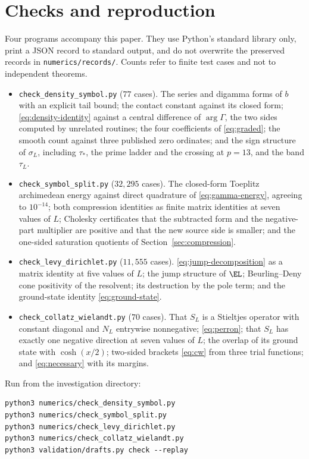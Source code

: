 \section{Checks and reproduction}\label{app:checks}
Four programs accompany this paper. They use Python's standard library only,
print a JSON record to standard output, and do not overwrite the preserved
records in \texttt{numerics/records/}. Counts refer to finite test cases and not
to independent theorems.

\begin{itemize}
\item \texttt{check\_density\_symbol.py} ($77$ cases). The series and digamma
forms of $b$ with an explicit tail bound; the contact constant against its
closed form; \eqref{eq:density-identity} against a central difference of
$\arg\Gamma$, the two sides computed by unrelated routines; the four
coefficients of \eqref{eq:graded}; the smooth count against three published zero
ordinates; and the sign structure of $\sigma_L$, including $\tau_*$, the prime
ladder and the crossing at $p=13$, and the band $\tau_L$.
\item \texttt{check\_symbol\_split.py} ($32{,}295$ cases). The closed-form
Toeplitz archimedean energy against direct quadrature of
\eqref{eq:gamma-energy}, agreeing to $10^{-14}$; both compression identities as
finite matrix identities at seven values of $L$; Cholesky certificates that the
subtracted form and the negative-part multiplier are positive and that the new
source side is smaller; and the one-sided saturation quotients of
Section~\ref{sec:compression}.
\item \texttt{check\_levy\_dirichlet.py} ($11{,}555$ cases).
\eqref{eq:jump-decomposition} as a matrix identity at five values of $L$; the
jump structure of $\EL$; Beurling--Deny cone positivity of the resolvent; its
destruction by the pole term; and the ground-state identity
\eqref{eq:ground-state}.
\item \texttt{check\_collatz\_wielandt.py} ($70$ cases). That $S_L$ is a
Stieltjes operator with constant diagonal and $N_L$ entrywise nonnegative;
\eqref{eq:perron}; that $S_L$ has exactly one negative direction at seven values
of $L$; the overlap of its ground state with $\cosh(x/2)$; two-sided brackets
\eqref{eq:cw} from three trial functions; and \eqref{eq:necessary} with its
margins.
\end{itemize}

Run from the investigation directory:
\begin{verbatim}
python3 numerics/check_density_symbol.py
python3 numerics/check_symbol_split.py
python3 numerics/check_levy_dirichlet.py
python3 numerics/check_collatz_wielandt.py
python3 validation/drafts.py check --replay
\end{verbatim}

